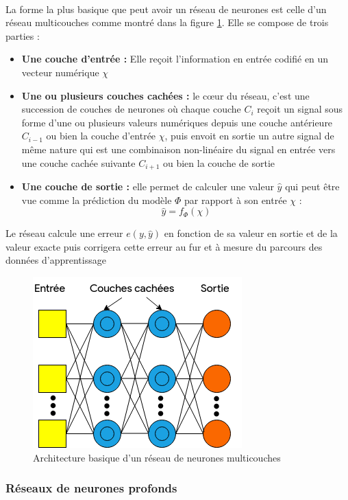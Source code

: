 \paragraph{}
La forme la plus basique que peut avoir un réseau de neurones est celle d'un réseau multicouches comme montré dans la figure \ref{mlp}. Elle se compose de trois parties :
\begin{itemize}
	\item \textbf{Une couche d'entrée :} Elle reçoit l'information en entrée codifié en un vecteur numérique $\chi$
	
	\item  \textbf{Une ou plusieurs couches cachées :} le c\oe{}ur du réseau, c'est une succession de couches de neurones où chaque couche $C_i$ reçoit un signal sous forme d'une ou plusieurs valeurs numériques depuis une couche antérieure $C_{i-1}$ ou bien la couche d'entrée $\chi$, puis envoit en sortie un autre signal de même nature qui est une combinaison non-linéaire du signal en entrée vers une couche cachée suivante $C_{i+1}$ ou bien la couche de sortie
	\item \textbf{Une couche de sortie :}
	elle permet de calculer une valeur $\hat{y}$ qui peut être vue comme la prédiction du modèle $\Phi$ par rapport à son entrée $\chi$ : 
	\begin{equation}
	\hat{y} = f_\Phi(\chi)
	\end{equation}
\end{itemize}
Le réseau calcule une erreur $e(y,\hat{y})$ en fonction de sa valeur en sortie et de la valeur exacte puis corrigera cette erreur au fur et à mesure du parcours des données d'apprentissage \citep{mlp}
\begin{figure}[H]
	\centering
	\includegraphics[width=0.5\linewidth]{images/notions/mlp.png}
	\caption{Architecture basique d'un réseau de neurones multicouches}
	\label{mlp}
\end{figure}

\subsubsection{Réseaux de neurones profonds}\label{part2DNN}
